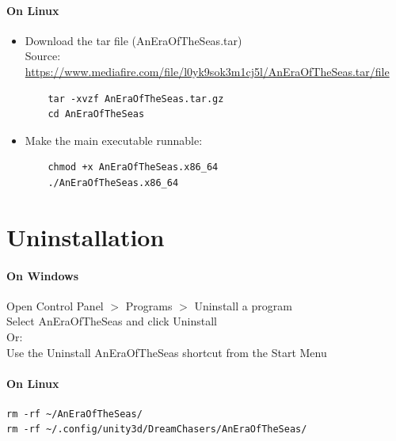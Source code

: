 \documentclass{article}
\begin{document}
\paragraph{On Linux}\hfill
\begin{itemize}
    \item \noindent Download the tar file (AnEraOfTheSeas.tar)\\Source: \url{https://www.mediafire.com/file/l0yk9sok3m1cj5l/AnEraOfTheSeas.tar/file}
    \begin{verbatim}
    tar -xvzf AnEraOfTheSeas.tar.gz
    cd AnEraOfTheSeas
    \end{verbatim}
    \item \noindent Make the main executable runnable:
    \begin{verbatim}
    chmod +x AnEraOfTheSeas.x86_64
    ./AnEraOfTheSeas.x86_64
    \end{verbatim}
\end{itemize}





\section{Uninstallation}
\paragraph{On Windows}\hfill

\noindent Open Control Panel $>$ Programs $>$ Uninstall a program\\
Select AnEraOfTheSeas and click Uninstall\\
Or:\\
Use the Uninstall AnEraOfTheSeas shortcut from the Start Menu

\paragraph{On Linux}
\begin{verbatim}
rm -rf ~/AnEraOfTheSeas/
rm -rf ~/.config/unity3d/DreamChasers/AnEraOfTheSeas/
\end{verbatim}










\newpage
\end{document}
